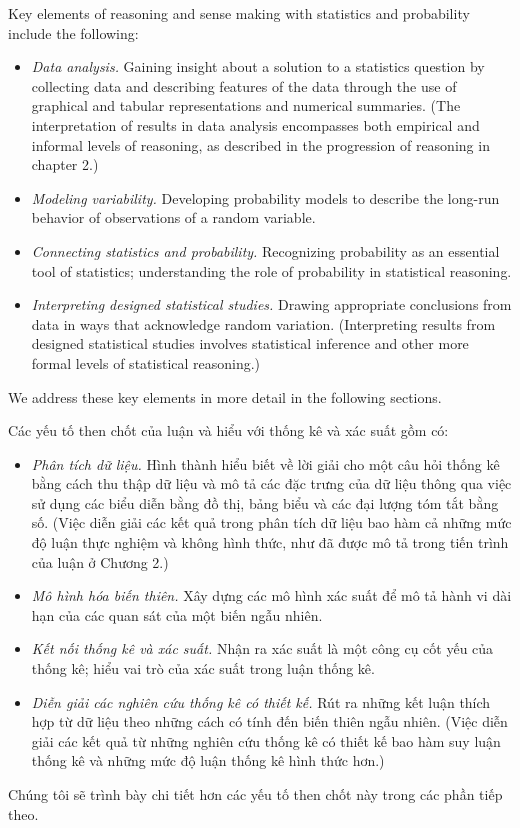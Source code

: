 \documentclass[
  10pt,
  a4paper,
  landscape,
  twoside,
  openany
]{scrbook}
\newcommand{\EN}[1]{#1}
\newcommand{\VI}[1]{#1}
\newcommand{\NOTE}[1]{#1}
\begin{document}
\TriPara
{
\EN{Key elements of reasoning and sense making with statistics and probability include the following:

\begin{itemize}
  \item \emph{Data analysis.} Gaining insight about a solution to a statistics question by collecting data and describing features of the data through the use of graphical and tabular representations and numerical summaries. (The interpretation of results in data analysis encompasses both empirical and informal levels of reasoning, as described in the progression of reasoning in chapter 2.)
  \item \emph{Modeling variability.} Developing probability models to describe the long-run behavior of observations of a random variable.
  \item \emph{Connecting statistics and probability.} Recognizing probability as an essential tool of statistics; understanding the role of probability in statistical reasoning.
  \item \emph{Interpreting designed statistical studies.} Drawing appropriate conclusions from data in ways that acknowledge random variation. (Interpreting results from designed statistical studies involves statistical inference and other more formal levels of statistical reasoning.)
\end{itemize}

We address these key elements in more detail in the following sections.}
}
{
\VI{Các yếu tố then chốt của luận và hiểu với thống kê và xác suất gồm có:

\begin{itemize}
  \item \emph{Phân tích dữ liệu.} Hình thành hiểu biết về lời giải cho một câu hỏi thống kê bằng cách thu thập dữ liệu và mô tả các đặc trưng của dữ liệu thông qua việc sử dụng các biểu diễn bằng đồ thị, bảng biểu và các đại lượng tóm tắt bằng số. (Việc diễn giải các kết quả trong phân tích dữ liệu bao hàm cả những mức độ luận thực nghiệm và không hình thức, như đã được mô tả trong tiến trình của luận ở Chương 2.)
  \item \emph{Mô hình hóa biến thiên.} Xây dựng các mô hình xác suất để mô tả hành vi dài hạn của các quan sát của một biến ngẫu nhiên.
  \item \emph{Kết nối thống kê và xác suất.} Nhận ra xác suất là một công cụ cốt yếu của thống kê; hiểu vai trò của xác suất trong luận thống kê.
  \item \emph{Diễn giải các nghiên cứu thống kê có thiết kế.} Rút ra những kết luận thích hợp từ dữ liệu theo những cách có tính đến biến thiên ngẫu nhiên. (Việc diễn giải các kết quả từ những nghiên cứu thống kê có thiết kế bao hàm suy luận thống kê và những mức độ luận thống kê hình thức hơn.)
\end{itemize}

Chúng tôi sẽ trình bày chi tiết hơn các yếu tố then chốt này trong các phần tiếp theo.}
}
{
\NOTE{}
}
\end{document}
